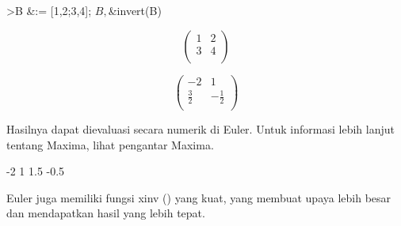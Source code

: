 \documentclass[a4paper,10pt]{article}
\begin{document}
\begin{eulernotebook}
\begin{eulercomment}
\begin{eulercomment}
\begin{eulercomment}
\begin{eulercomment}
\begin{eulercomment}
\begin{eulercomment}
\begin{eulerttcomment}
\end{eulerttcomment}
\begin{eulerprompt}
>B &:= [1,2;3,4]; $B, $&invert(B)
\end{eulerprompt}
\begin{eulerformula}
\[
\begin{pmatrix}1 & 2 \\ 3 & 4 \\ \end{pmatrix}
\]
\end{eulerformula}
\begin{eulerformula}
\[
\begin{pmatrix}-2 & 1 \\ \frac{3}{2} & -\frac{1}{2} \\ 
 \end{pmatrix}
\]
\end{eulerformula}
\begin{eulercomment}
Hasilnya dapat dievaluasi secara numerik di Euler. Untuk informasi
lebih lanjut tentang Maxima, lihat pengantar Maxima.
\end{eulercomment}
\begin{euleroutput}
             -2             1 
            1.5          -0.5 
\end{euleroutput}
\begin{eulercomment}
Euler juga memiliki fungsi xinv () yang kuat, yang membuat upaya lebih
besar dan mendapatkan hasil yang lebih tepat.


\end{eulercomment}
\end{eulercomment}
\end{eulercomment}
\end{eulercomment}
\end{eulercomment}
\end{eulercomment}
\end{eulercomment}
\end{eulernotebook}
\end{document}
